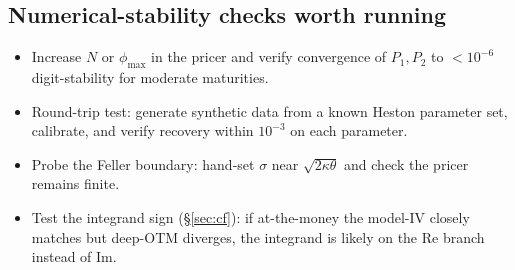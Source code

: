 \documentclass[11pt,a4paper]{article}
\begin{document}
\subsection*{Numerical-stability checks worth running}
\begin{itemize}
\item Increase $N$ or $\phi_{\max}$ in the pricer and verify convergence of $P_1, P_2$ to ${<}10^{-6}$ digit-stability for moderate maturities.
\item Round-trip test: generate synthetic data from a known Heston parameter set, calibrate, and verify recovery within $10^{-3}$ on each parameter.
\item Probe the Feller boundary: hand-set $\sigma$ near $\sqrt{2\kappa\theta}$ and check the pricer remains finite.
\item Test the integrand sign (\S\ref{sec:cf}): if at-the-money the model-IV closely matches but deep-OTM diverges, the integrand is likely on the $\mathrm{Re}$ branch instead of $\mathrm{Im}$.
\end{itemize}
\end{document}
